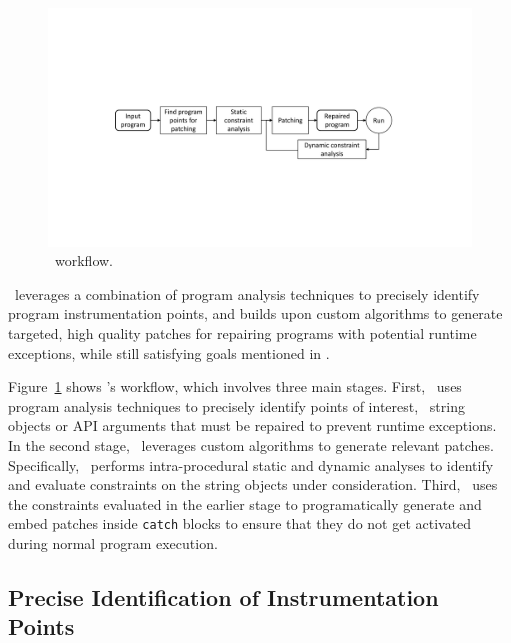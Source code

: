 \section{\tool}
\label{sec:design}

\begin{figure}[t]
\centering
\includegraphics[scale=.38]{images/NewDesignDiagram.pdf}
\caption{\tool\ workflow.}
\label{fig:overallDesign}
\end{figure}

 \tool\ leverages a combination of program 
analysis techniques to precisely identify program instrumentation points, and
builds upon custom algorithms to generate targeted, high quality patches for
repairing programs with potential runtime exceptions, while still satisfying
goals mentioned in .

Figure~\ref{fig:overallDesign} shows \tool's workflow, which involves three
main stages. First, \tool\ uses program analysis techniques to precisely
identify points of interest, \ie\ string objects or API arguments that must be
repaired to prevent runtime exceptions. In the second stage, \tool\ leverages
custom algorithms to generate relevant patches. Specifically, \tool\ performs
intra-procedural static and dynamic analyses to identify and evaluate
constraints on the string objects under consideration. Third, \tool\ uses the
constraints evaluated in the earlier stage to programatically generate and embed
patches inside \texttt{catch} blocks to ensure that they do not get activated
during normal program execution.

\subsection{Precise Identification of Instrumentation Points}
\label{sec:tool:stage1}


